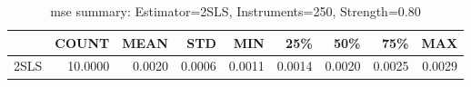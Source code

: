 \begin{table}[ht]
\centering
\caption{mse summary: Estimator=2SLS, Instruments=250, Strength=0.80}
\begin{tabular}{lrrrrrrrr}
\toprule
 & COUNT & MEAN & STD & MIN & 25\% & 50\% & 75\% & MAX \\
\midrule
2SLS & 10.0000 & 0.0020 & 0.0006 & 0.0011 & 0.0014 & 0.0020 & 0.0025 & 0.0029 \\
\bottomrule
\end{tabular}
\end{table}
